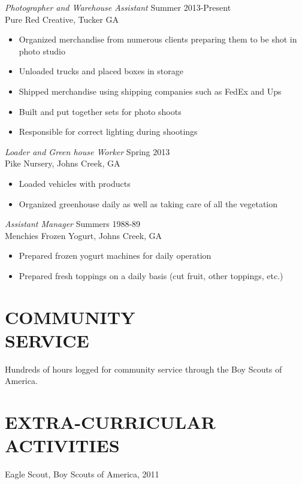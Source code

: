 \documentclass[margin, 10pt]{res} %
\begin{document}
\begin{resume}
{\sl Photographer and Warehouse Assistant} \hfill Summer 2013-Present \\
Pure Red Creative, Tucker GA 

\begin{itemize} \itemsep -2pt %
\item Organized merchandise from numerous clients preparing them to be shot in photo studio
\item Unloaded trucks and placed boxes in storage
\item Shipped merchandise using shipping companies such as FedEx and Ups
\item Built and put together sets for photo shoots
\item Responsible for correct lighting during shootings
\end{itemize}
 
{\sl Loader and Green house Worker} \hfill Spring 2013 \\
Pike Nursery, Johns Creek, GA
\begin{itemize} 
\item Loaded vehicles with products 
\item Organized greenhouse daily as well as taking care of all the vegetation 
\end{itemize} 

{\sl Assistant Manager} \hfill Summers 1988-89 \\
Menchies Frozen Yogurt, Johns Creek, GA
\begin{itemize}
\item Prepared frozen yogurt machines for daily operation
\item Prepared fresh toppings on a daily basis (cut fruit, other toppings, etc.)
\end{itemize} 


\section{COMMUNITY \\ SERVICE}

Hundreds of hours logged for community service through the Boy Scouts of America. 


\section{EXTRA-CURRICULAR \\ ACTIVITIES} 

Eagle Scout, Boy Scouts of America, 2011


\end{resume}
\end{document}
